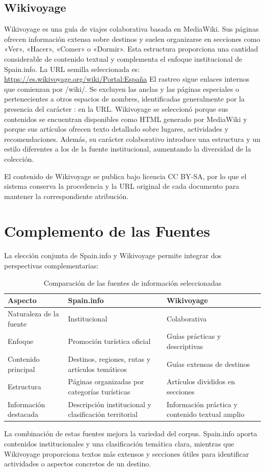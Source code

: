 \subsection{Wikivoyage}
Wikivoyage es una guía de viajes colaborativa basada en MediaWiki. Sus páginas ofrecen información extensa sobre destinos y suelen organizarse en secciones como «Ver», «Hacer», «Comer» o «Dormir». Esta estructura proporciona una cantidad considerable de contenido textual y complementa el enfoque institucional de Spain.info.
La URL semilla seleccionada es:
\url{https://es.wikivoyage.org/wiki/Portal:España}
El rastreo sigue enlaces internos que comienzan por /wiki/. Se excluyen las anclas y las páginas especiales o pertenecientes a otros espacios de nombres, identificadas generalmente por la presencia del carácter : en la URL.
Wikivoyage se seleccionó porque sus contenidos se encuentran disponibles como HTML generado por MediaWiki y porque sus artículos ofrecen texto detallado sobre lugares, actividades y recomendaciones. Además, su carácter colaborativo introduce una estructura y un estilo diferentes a los de la fuente institucional, aumentando la diversidad de la colección.

El contenido de Wikivoyage se publica bajo licencia CC BY-SA, por lo que el sistema conserva la procedencia y la URL original de cada documento para mantener la correspondiente atribución.

\section{Complemento de las Fuentes}
La elección conjunta de Spain.info y Wikivoyage permite integrar dos perspectivas complementarias:
\begin{table}[htbp] 
    \centering 
    \caption{Comparación de las fuentes de información seleccionadas} 
    \label{tab:comparacion-fuentes} 
    \begin{tabular}{|p{3cm}|p{4cm}|p{5cm}|} 
        \hline \textbf{Aspecto} & \textbf{Spain.info} & \textbf{Wikivoyage} \\ 
        \hline Naturaleza de la fuente & Institucional & Colaborativa \\ 
        \hline Enfoque & Promoción turística oficial & Guías prácticas y descriptivas \\ 
        \hline Contenido principal & Destinos, regiones, rutas y artículos temáticos & Guías extensas de destinos \\ 
        \hline Estructura & Páginas organizadas por categorías turísticas & Artículos divididos en secciones \\ 
        \hline Información destacada & Descripción institucional y clasificación territorial & Información práctica y contenido textual amplio \\ 
        \hline 
    \end{tabular} 
\end{table}
La combinación de estas fuentes mejora la variedad del corpus. Spain.info aporta contenidos institucionales y una clasificación temática clara, mientras que Wikivoyage proporciona textos más extensos y secciones útiles para identificar actividades o aspectos concretos de un destino.

